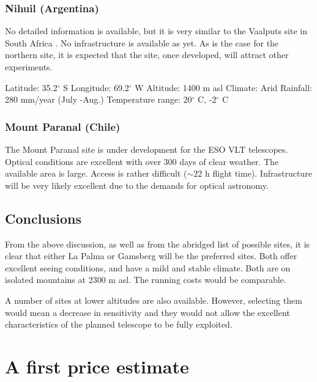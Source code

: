 \subsection{Nihuil (Argentina)}

\medskip No detailed information is available, but it is very similar to the Vaalputs
site in South Africa \cite{auger}. No infrastructure is available as
yet. As is the case for the northern site, it is expected that the site,
once developed, will attract other experiments.

\noindent
Latitude: 35.2$^\circ$ S \newline
Longitude: 69.2$^\circ$ W \newline
Altitude: 1400 m asl Climate: Arid Rainfall: 280 mm/year (July -Aug.)
Temperature range: 20$^\circ$ C, -2$^\circ$ C

\subsection{Mount Paranal (Chile)}

\medskip The Mount Paranal site is under development for the ESO VLT telescopes.
Optical conditions are excellent with over 300 days of clear weather. The
available area is large. Access is rather difficult ($\sim 22$ h flight
time). Infrastructure will be very likely excellent due to the demands for
optical astronomy.

\section{Conclusions}

\medskip From the above discussion, as well as from the abridged list of possible
sites, it is clear that either La Palma or Gamsberg will be the preferred
sites. Both offer excellent seeing conditions, and have a mild and stable
climate. Both are on isolated mountains at 2300 m asl. The running costs
would be comparable.

A number of sites at lower altitudes are also available. However, selecting
them would mean a decrease in sensitivity and they would not allow the
excellent characteristics of the planned telescope to be fully exploited.
\cleardoublepage





                      

\chapter{A first price estimate}
\label{cha-price}

